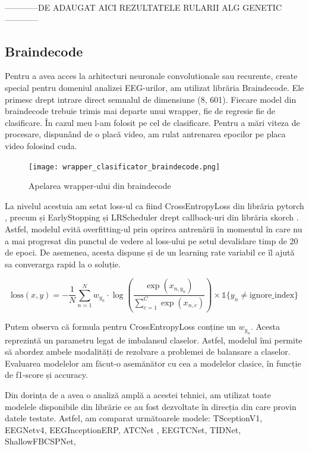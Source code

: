 ------------DE ADAUGAT AICI REZULTATELE RULARII ALG GENETIC------------

\subsection{Braindecode}
Pentru a avea acces la arhitecturi neuronale convolutionale sau recurente, create special pentru domeniul analizei EEG-urilor, am utilizat librăria Braindecode. Ele primesc drept intrare direct semnalul de dimensiune (8, 601). Fiecare model din braindecode trebuie trimis mai departe unui wrapper, fie de regresie fie de clasificare. În cazul meu l-am folosit pe cel de clasificare. Pentru a mări viteza de procesare, dispunând de o placă video, am rulat antrenarea epocilor pe placa video folosind cuda.

\vspace{1em}
\begin{figure}[h]
    \centering
    \texttt{[image: wrapper\_clasificator\_braindecode.png]}
    \caption{Apelarea wrapper-ului din braindecode}
    \label{fig:enter-label}
\end{figure}

La nivelul acestuia am setat loss-ul ca fiind CrossEntropyLoss din librăria pytorch \cite{pytorch}, precum și EarlyStopping și LRScheduler drept callback-uri din librăria skorch \cite{skorch}. Astfel, modelul evită overfitting-ul prin oprirea antrenării în momentul în care nu a mai progresat din punctul de vedere al loss-ului pe setul devalidare timp de 20 de epoci. De asemenea, acesta dispune și de un learning rate variabil ce îl ajută sa converarga rapid la o soluție. 

\begin{equation}
    \text{loss}(x, y) = -\frac{1}{N} \sum_{n=1}^{N} w_{y_n} \cdot \log\left(\frac{\exp(x_{n,y_n})}{\sum_{c=1}^{C} \exp(x_{n,c})}\right) \times \mathbb{1}\{y_n \neq \text{ignore\_index}\}
\end{equation}

Putem observa că formula pentru CrossEntropyLoss conține un \(w_{y_n}\). Acesta reprezintă un parametru legat de imbalansul claselor. Astfel, modelul îmi permite să abordez ambele modalități de rezolvare a problemei de balansare a claselor. Evaluarea modelelor am făcut-o asemănător cu cea a modelelor clasice, în funcție de f1-score și accuracy.

Din dorința de a avea o analiză amplă a acestei tehnici, am utilizat toate modelele disponibile din librărie ce au fost dezvoltate în direcția din care provin datele testate. Astfel, am comparat următoarele modele: TSceptionV1, EEGNetv4\cite{eegnetv4}, EEGInceptionERP\cite{eeginceptionerp}, ATCNet \cite{atcnet1}\cite{atcnet2}\cite{atcnet3}, EEGTCNet\cite{tcnet}, TIDNet\cite{tidnet}, ShallowFBCSPNet\cite{ShallowFBCSPNet}, 

